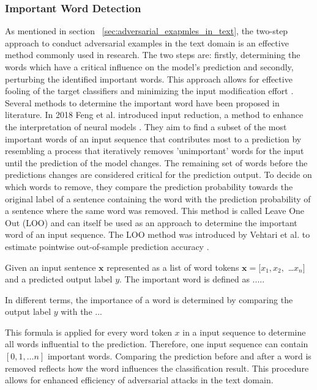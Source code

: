 \subsubsection{Important Word Detection}
\label{sec:iwd_method}
As mentioned in section ~\ref{sec:adversarial_exapmles_in_text}, the two-step approach to conduct adversarial examples in the text domain is an effective method commonly used in research. The two steps are: firstly, determining the words which have a critical influence on the model's prediction and secondly, perturbing the identified important words. This approach allows for effective fooling of the target classifiers and minimizing the input modification effort \cite{jin2019bert}. Several methods to determine the important word have been proposed in literature.
In 2018 Feng et al. introduced input reduction, a method to enhance the interpretation of neural models \cite{feng2018pathologies}. They aim to find a subset of the most important words of an input sequence that contributes most to a prediction by resembling a process that iteratively removes 'unimportant' words for the input until the prediction of the model changes. The remaining set of words before the predictions changes are considered critical for the prediction output. To decide on which words to remove, they compare the prediction probability towards the original label of a sentence containing the word with the prediction probability of a sentence where the same word was removed. This method is called Leave One Out (LOO) and can itself be used as an approach to determine the important word of an input sequence. The LOO method was introduced by Vehtari et al. to estimate pointwise out-of-sample prediction accuracy \cite{vehtari2017practical}. 

Given an input sentence $\textbf{x}$ represented as a list of word tokens ${\textbf{x} = [x_1, x_2,}$ \dots${x_n]}$ and a predicted output label $y$. The important word is defined as 
.....

In different terms, the importance of a word is determined by comparing the output label $y$ with the ...

This formula is applied for every word token $x$ in a input sequence to determine all words influential to the prediction. Therefore, one input sequence can contain $[0,1, \dots n]$ important words. 
Comparing the prediction before and after a word is removed reflects how the word influences the classification result. This procedure allows for enhanced efficiency of adversarial attacks in the text domain.


